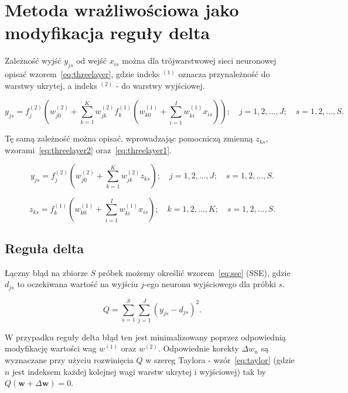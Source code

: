 \documentclass[11pt,a4paper]{article}
\begin{document}
\section{Metoda wrażliwościowa jako modyfikacja reguły delta~\label{sec:castillodelta}}
Zależność wyjść $y_{js}$ od wejść $x_{is}$ można dla trójwarstwowej sieci neuronowej opisać wzorem~\ref{eq:threelayer}, gdzie indeks $^{(1)}$ oznacza przynależność do warstwy ukrytej, a indeks $^{(2)}$ - do warstwy wyjściowej.

\begin{equation}
y_{js} = f^{(2)}_j \left( w^{(2)}_{j0} + \sum_{k=1}^{K} w^{(2)}_{jk} f^{(1)}_k \left( w^{(1)}_{k0} + \sum_{i=1}^{I}w^{(1)}_{ki}x_{is} \right)\right); \quad j = 1,2,...,J; \quad s = 1,2,...,S.
\label{eq:threelayer}
\end{equation}

\newpage

\noindent Tę samą zależność można opisać, wprowadzając pomocniczą zmienną $z_{ks}$, wzorami~\ref{eq:threelayer2} oraz~\ref{eq:threelayer1}.

\begin{equation}
y_{js} = f^{(2)}_j \left( w^{(2)}_{j0} + \sum_{k=1}^{K} w^{(2)}_{jk} z_{ks}\right); \quad j = 1,2,...,J; \quad s = 1,2,...,S.
\label{eq:threelayer2}
\end{equation}

\begin{equation}
z_{ks} = f^{(1)}_k \left( w^{(1)}_{k0} + \sum_{i=1}^{I}w^{(1)}_{ki}x_{is} \right); \quad k = 1,2,...,K; \quad s = 1,2,...,S.
\label{eq:threelayer1}
\end{equation}

\subsection{Reguła delta}
Łączny błąd na zbiorze $S$ próbek możemy określić wzorem~\ref{eq:sse} (SSE), gdzie $d_{js}$ to oczekiwana wartość na wyjściu $j$-ego neuronu wyjściowego dla próbki $s$.

\begin{equation}
Q = \sum_{s=1}^{S} \sum_{j=1}^{J} \left( y_{js}  - d_{js} \right)^{2}.
\label{eq:sse}
\end{equation}

W przypadku reguły delta błąd ten jest minimalizowany poprzez odpowiednią modyfikację wartości wag $w^{(1)}$ oraz $w^{(2)}$. Odpowiednie korekty $\Delta w_{n}$ są wyznaczane przy użyciu rozwinięcia $Q$ w szereg Taylora - wzór~\ref{eq:taylor} (gdzie $n$ jest indeksem każdej kolejnej wagi warstw ukrytej i wyjściowej) tak by $Q(\bm{w} + \Delta \bm{w}) = 0$.
\end{document}

